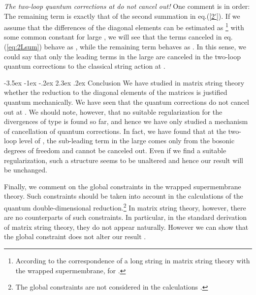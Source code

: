 \documentclass[a4paper,12pt]{article}
\makeatletter
\renewcommand\section{\@startsection {section}{1}{\z@}%
		{-3.5ex \@plus -1ex \@minus -.2ex}%
		{2.3ex \@plus.2ex}%
		{\normalfont\large\bfseries}}
\makeatother
\begin{document}
\textit{The two-loop quantum corrections at \coordHE{} do not cancel
out!}  One comment is in order:  The remaining term is exactly
that of the second summation in eq.(\ref{2'}).
If we assume that the differences of the diagonal elements can be
estimated as \coordHE{}\footnote{According to
the correspondence of a long string in matrix string theory
with the wrapped supermembrane, \coordHE{} for \coordHE{}
\cite{SY}.} with some common constant \myHighlight{$\alpha$}\coordHE{} for large \coordHE{},
we will see that the terms canceled in eq.(\ref{eq:2Lsum})
behave as \coordHE{}, while the remaining term
behaves as \coordHE{}.
In this sense, we could say that only the leading terms in the large
\coordHE{} are canceled in the two-loop quantum corrections to the
classical string action at \coordHE{}.

\section{Conclusion}
We have studied in matrix string theory whether the reduction to
the diagonal elements of the matrices is justified quantum
mechanically. We have seen that the quantum corrections do not cancel
out at \coordHE{}. We should note, however, that no suitable
regularization for the divergences of \coordHE{} type is found
so far, and hence we have only studied a mechanism of cancellation of
quantum corrections.
In fact, we have found that at the two-loop level of \coordHE{},
the sub-leading term in the large \coordHE{} comes only from the bosonic
degrees of freedom and cannot be canceled out.
Even if we find a suitable regularization, such a structure seems to
be unaltered and hence our result will be unchanged.

Finally, we comment on the global constraints in the wrapped
supermembrane theory.
Such constraints should be taken into account in the calculations of
the quantum double-dimensional reduction.\footnote{The global
constraints are not considered in the calculations \cite{SY}.}
In matrix string theory, however, there are no counterparts of such
constraints.
In particular, in the standard derivation of matrix string theory,
they do not appear naturally.
However we can show that the global constraint does not alter our
result \cite{UY2}.
\end{document}
